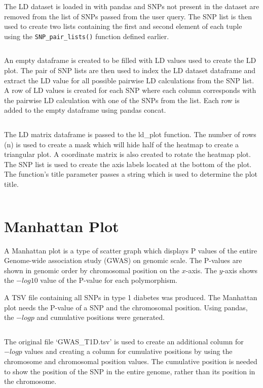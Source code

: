 \documentclass[12pt,a4paper]{article}
\newcommand{\mintfile}[1]{
\begin{tcolorbox}[colback=gray!5!white,%
	grow to left by=20mm,
    grow to right by=20mm,
    sharp corners]{{    \small \inputminted[breaklines]{python}{#1}		}}
\end{tcolorbox}}
\newcommand{\sect}[1]{
\clearpage
\hypertarget{#1}{
\section{#1}\label{#1}}
}
\begin{document}
The LD dataset is loaded in with pandas and SNPs not present in the dataset are removed from the list of SNPs passed from the user query. The SNP list is then used to create two lists containing the first and second element of each tuple using the \texttt{SNP\_pair\_lists()} function defined earlier.
\mintfile{code_snippets/placeholder.py}

An empty dataframe is created to be filled with LD values used to create the LD plot. The pair of SNP lists are then used to index the LD dataset dataframe and extract the LD value for all possible pairwise LD calculations from the SNP list. A row of LD values is created for each SNP where each column corresponds with the pairwise LD calculation with one of the SNPs from the list. Each row is added to the empty dataframe using pandas concat.
\mintfile{code_snippets/placeholder.py}

The LD matrix dataframe is passed to the ld\_plot function. The number of rows (n) is used to create a mask which will hide half of the heatmap to create a triangular plot. A coordinate matrix is also created to rotate the heatmap plot. The SNP list is used to create the axis labels located at the bottom of the plot. The function’s title parameter passes a string which is used to determine the plot title.
\mintfile{code_snippets/placeholder.py}

\sect{Manhattan Plot}

A Manhattan plot is a type of scatter graph which displays P values of the entire Genome-wide association study (GWAS) on genomic scale. The P-values are shown in genomic order by chromosomal position on the $x$-axis. The $y$-axis shows the $-log10$ value of the P-value for each polymorphism.

A TSV file containing all SNPs in type 1 diabetes was produced. The Manhattan plot needs the P-value of a SNP and the chromosomal position. Using pandas, the $-logp$ and cumulative positions were generated.

\mintfile{code_snippets/manPlot/createTSV.py}
The original file `GWAS\_T1D.tsv’ is used to create an additional column for $-logp$ values and creating a column for cumulative positions by using the chromosome and chromosomal position values.
The cumulative position is needed to show the position of the SNP in the entire genome, rather than its position in the chromosome.
\end{document}
